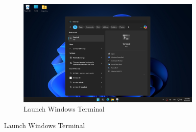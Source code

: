 \begin{figure}[h]
\begin{subfigure}[h]{0.48\textwidth}
    \end{subfigure}
    \begin{subfigure}[h]{0.48\textwidth}
        \includegraphics[width=\textwidth]{./image/windows_terminal}
        \caption{Launch Windows Terminal}
    \end{subfigure}
\end{figure}

